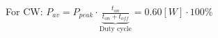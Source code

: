 \documentclass[preview]{standalone}
\begin{document}
\begin{center}
For CW: $P_{av} = P_{peak} \cdot \underbrace{\frac{t_{on}}{t_{on}+t_{off}}}_{\text{Duty cycle}}=$$0.60 [W] \cdot 100 \%$
\end{center}
\end{document}
